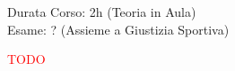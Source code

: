 \documentclass[../uefaC.tex]{subfiles}
\begin{document}

Durata Corso: 2h (Teoria in Aula) \hfill \\
Esame: ? (Assieme a Giustizia Sportiva)

\textcolor{red}{TODO}
\end{document}
